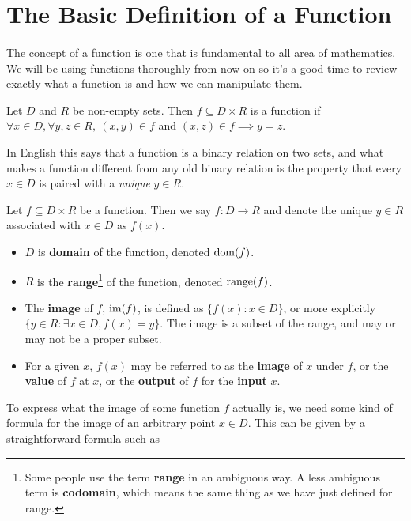 \documentclass[../real_analysis.tex]{subfiles}
\begin{document}
    \section{The Basic Definition of a Function}
        \paragraph{}
        The concept of a function is one that is fundamental to all area of mathematics. We will be using functions thoroughly from now on so it's a good time to review exactly what a function is and how we can manipulate them.
        \begin{definition}
            Let $D$ and $R$ be non-empty sets. Then $f \subseteq D \times R$ is a function if $\forall x \in D, \forall y, z \in R,\ (x, y) \in f$ and $(x, z) \in f \implies y = z.$
        \end{definition}
        In English this says that a function is a binary relation on two sets, and what makes a function different from any old binary relation is the property that every $x \in D$ is paired with a \textit{unique} $y \in R$.
        \begin{definition}
            Let $f \subseteq D \times R$ be a function.
            Then we say $f: D \to R$ and denote the unique $y \in R$ associated with $x \in D$ as $f(x)$.
            \begin{itemize}
                \item $D$ is \textbf{domain} of the function, denoted $\operatorname{dom}(f)$.
                \item $R$ is the \textbf{range}\footnote{Some people use the term \textbf{range} in an ambiguous way. A less ambiguous term is \textbf{codomain}, which means the same thing as we have just defined for range.} of the function, denoted $\operatorname{range}(f)$.
                \item The \textbf{image} of $f$, $\operatorname{im}(f)$, is defined as ${\{f(x):x \in D\}}$, or more explicitly ${\{y \in R : \exists x \in D, f(x)=y\}}$. The image is a subset of the range, and may or may not be a proper subset.
                \item For a given $x$, $f(x)$ may be referred to as the \textbf{image} of $x$ under $f$, or the \textbf{value} of $f$ at $x$, or the \textbf{output} of $f$ for the \textbf{input} $x$.
            \end{itemize}
        \end{definition}
        To express what the image of some function $f$ actually is, we need some kind of formula for the image of an arbitrary point $x \in D$. This can be given by a straightforward formula such as
\end{document}
